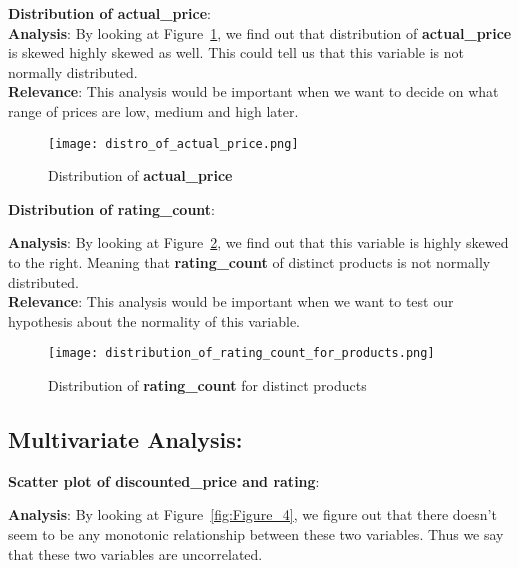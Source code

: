 \documentclass[a4paper,12pt]{article}
\begin{document}
\noindent\textbf{Distribution of actual\_price}: \\

\noindent\textbf{Analysis}: By looking at Figure~\ref{fig:Figure_2}, we find out that distribution of \textbf{actual\_price} is skewed highly skewed as well. This could tell us that this variable is not normally distributed. \\

\noindent\textbf{Relevance}: This analysis would be important when we want to decide on what range of prices are low, medium and high later. \\ 

\begin{figure}[H]
    \centering
    \texttt{[image: distro\_of\_actual\_price.png]} %
    \caption{Distribution of \textbf{actual\_price}}
    \label{fig:Figure_2}
\end{figure}

\noindent\textbf{Distribution of rating\_count}:

\noindent\textbf{Analysis}: By looking at Figure~\ref{fig:Figure_3}, we find out that this variable is highly skewed to the right. Meaning that \textbf{rating\_count} of distinct products is not normally distributed. \\

\noindent\textbf{Relevance}: This analysis would be important when we want to test our hypothesis about the normality of this variable.\\

\begin{figure}[H]
    \centering
    \texttt{[image: distribution\_of\_rating\_count\_for\_products.png]} %
    \caption{Distribution of \textbf{rating\_count} for distinct products}
    \label{fig:Figure_3}
\end{figure}


\subsection*{Multivariate Analysis:}

\noindent\textbf{Scatter plot of discounted\_price and rating}:

\noindent\textbf{Analysis}: By looking at Figure~\ref{fig:Figure_4}, we figure out that there doesn't seem to be any monotonic relationship between these two variables. Thus we say that these two variables are uncorrelated. \\
\end{document}
